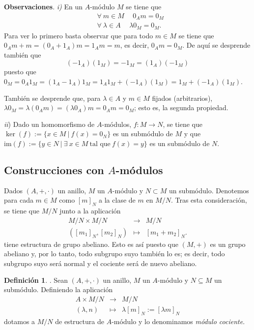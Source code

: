 \documentclass[a4paper,12pt]{article}
\theoremstyle{definition}
\newtheorem{definition}[theorem]{Definición}
\begin{document}
\textbf{Observaciones}. \textit{\textit{i})} En un $A$-módulo $M$ se tiene que\begin{align*}
    &\forall\ m\in M \hspace{15pt}0_Am=0_M\\
    &\forall\ \lambda\in A \hspace{15pt}\lambda0_M=0_M.
\end{align*}
Para ver lo primero basta observar que para todo $m\in M$ se tiene que $0_Am+m=(0_A+1_A)m=1_Am=m$, es decir, $0_Am=0_M$. De aquí se desprende también que $$(-1_A)(1_M)=-1_M=(1_A)(-1_M)$$ puesto que $0_M=0_A1_M=(1_A-1_A)1_M=1_A1_M+(-1_A)(1_M)=1_M+(-1_A)(1_M)$.

También se desprende que, para $\lambda\in A$ y $m\in M$ fijados (arbitrarios), $\lambda0_M=\lambda(0_Am)=(\lambda0_A)m=0_Am=0_M$; esto es, la segunda propiedad.

\textit{ii}) Dado un homomorfismo de $A$-módulos, $f:M\longrightarrow N$, se tiene que $\ker(f):=\{x\in M\ |\ f(x)=0_N\}$ es un submódulo de $M$ y que $\text{im}(f):=\{y\in N\ |\ \exists\ x\in M\ \text{tal que}\ f(x)=y\}$ es un submódulo de $N$.

\subsection{Construcciones con $A$-módulos}
Dados $(A,+,\cdot)$ un anillo, $M$ un $A$-módulo y $N\subset M$ un submódulo. Denotemos para cada $m\in M$ como $[m]_N$ a la clase de $m$ en $M/N$. Tras esta consideración, se tiene que $M/N$ junto a la aplicación
$$\begin{array}{rcl}
    M/N\times M/N&\longrightarrow&M/N\\
    ([m_1]_N,[m_2]_N)&\longmapsto&[m_1+m_2]_N.
\end{array}$$
tiene estructura de grupo abeliano. Esto es así puesto que $(M,+)$ es un grupo abeliano y, por lo tanto, todo subgrupo suyo también lo es; es decir, todo subgrupo suyo será normal y el cociente será de nuevo abeliano.

\begin{definition}. Sean $(A,+,\cdot)$ un anillo, $M$ un $A$-módulo y $N\subseteq M$ un submódulo. Definiendo la aplicación
$$\begin{array}{rcl}
    A\times M/N&\longrightarrow&M/N\\
    (\lambda,n)&\longmapsto&\lambda[m]_N:=[\lambda m]_N
\end{array}$$
dotamos a $M/N$ de estructura de $A$-módulo y lo denominamos \textit{módulo cociente}.
\end{definition}
\end{document}
